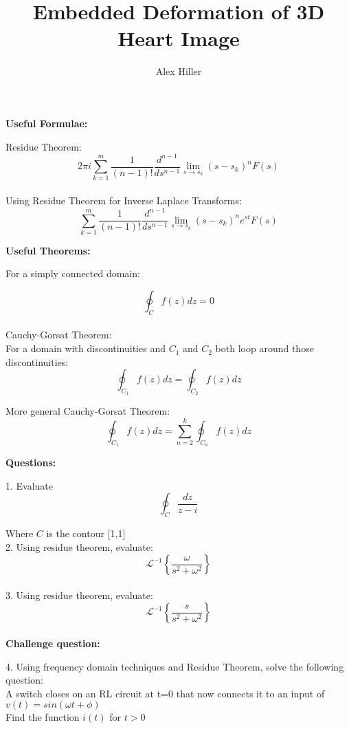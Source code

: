 \documentclass{article}
\author{Alex Hiller}
\title{Embedded Deformation of 3D Heart Image}
\begin{document}
\textbf{Useful Formulae:\\}

Residue Theorem:
\begin{equation}
  2 \pi i\sum^{m}_{k=1} \frac{1}{(n-1)!} \frac{d^{n-1}}{ds^{n-1}}  \lim_{s \to s_k}(s-s_k)^n F(s)
\end{equation} \\

Using Residue Theorem for Inverse Laplace Transforms:
\begin{equation}
  \sum^{m}_{k=1} \frac{1}{(n-1)!} \frac{d^{n-1}}{ds^{n-1}}  \lim_{s \to s_k}(s-s_k)^n e^{st}  F(s)
\end{equation}

\textbf{Useful Theorems: \\}

For a simply connected domain:

\begin{equation}
  \oint_{C} f(z) dz = 0
\end{equation} \\

Cauchy-Gorsat Theorem: \\
For a domain with discontinuities and $C_1$ and $C_2$ both loop around those discontinuities:
\begin{equation}
  \oint_{C_1} f(z) dz = \oint_{C_2} f(z) dz
\end{equation}

More general Cauchy-Gorsat Theorem:
\begin{equation}
  \oint_{C_1} f(z) dz = \sum^{k}_{n=2} \oint_{C_n} f(z) dz
\end{equation}

\clearpage
\textbf{Questions: \\}

1. Evaluate 
\begin{equation}
  \oint_C \frac{dz}{z-i}
\end{equation}

Where $C$ is the contour [1,1] \to [-1,1] \to [-1,-1] \to [1,-1] \to [1,1] \\

2. Using residue theorem, evaluate:
\begin{equation}
  \mathcal{L}^{-1} \left\{ \frac{\omega}{s^2 + \omega^2} \right\}
\end{equation} \\

3. Using residue theorem, evaluate:
\begin{equation}
  \mathcal{L}^{-1} \left\{ \frac{s}{s^2 + \omega^2} \right\}
\end{equation} \\ 

\textbf{Challenge question:}

4. Using frequency domain techniques and Residue Theorem, solve the following question: \\

A switch closes on an RL circuit at t=0 that now connects it to an input of $v(t) = sin(\omega t + \phi)$ \\ 

Find the function $i(t)$ for $t>0$
\end{document}
